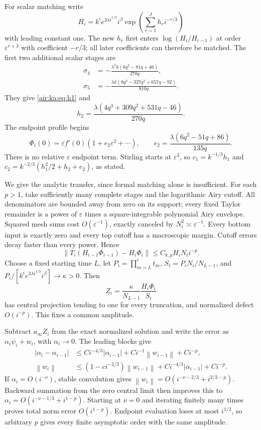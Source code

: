 \documentclass[11pt,letterpaper]{article}
\numberwithin{equation}{section}
\theoremstyle{remark}
\newcommand{\norm}[1]{\left\lVert#1\right\rVert}
\newcommand{\eps}{\varepsilon}
\begin{document}
For scalar matching write
\[
 H_i=k^ie^{3\lambda i^{1/3}}i^\beta
 \exp\left(\sum_{r=1}^Jh_ri^{-r/3}\right)
\]
with leading constant one. The new $h_r$ first enters
$\log(H_i/H_{i-1})$ at order $\eps^{r+3}$ with coefficient $-r/3$; all later coefficients can therefore be matched. The first two additional scalar stages are
\begin{align*}
 \sigma_4&=-\frac{\lambda^2 k(6q^2-81q+46)}{270q},\\
 \sigma_5&=-\frac{\lambda k(8q^3-327q^2+657q-92)}{810q}.
\end{align*}
They give \eqref{air:ka:eq:h1} and
\[
 h_2=\frac{\lambda(4q^3+309q^2+531q-46)}{270q}.
\]
The endpoint profile begins
\[
 \Phi_i(0)=\eps f'(0)(1+e_2\eps^2+\cdots),\qquad
 e_2=\frac{\lambda(6q^2-51q+86)}{135q}.
\]
There is no relative $\eps$ endpoint term. Stirling starts at $\eps^3$, so $c_1=k^{-1/3}h_1$ and $c_2=k^{-2/3}(h_1^2/2+h_2+e_2)$, as stated.

We give the analytic transfer, since formal matching alone is insufficient. For each $p>1$, take sufficiently many complete stages and the logarithmic Airy cutoff. All denominators are bounded away from zero on its support; every fixed Taylor remainder is a power of $\eps$ times a square-integrable polynomial Airy envelope. Squared mesh sums cost $O(\eps^{-1})$, exactly canceled by $N_i^2\asymp\eps^{-1}$. Every bottom input is exactly zero and every top cutoff has a macroscopic margin. Cutoff errors decay faster than every power. Hence
\[
 \norm{T_i(H_{i-1}\Phi_{i-1})-H_i\Phi_i}
 \le C_{k,p}H_iN_i i^{-p}.
\]
Choose a fixed starting time $L$, let $P_i=\prod_{m=L}^it_m$,
$S_i=P_iN_i/N_{L-1}$, and $P_i/[k^ie^{3\lambda i^{1/3}}i^\beta]\to\kappa>0$. Then
\[
 Z_i=\frac{\kappa}{N_{L-1}}\frac{H_i\Phi_i}{S_i}
\]
has central projection tending to one for every truncation, and normalized defect $O(i^{-p})$. This fixes a common amplitude.

Subtract $a_\infty Z_i$ from the exact normalized solution and write the error as $\alpha_i\psi_i+w_i$, with $\alpha_i\to0$. The leading blocks give
\begin{align*}
 |\alpha_i-\alpha_{i-1}|&\le C i^{-4/3}|\alpha_{i-1}|
 +C i^{-1}\norm{w_{i-1}}+C i^{-p},\\
 \norm{w_i}&\le(1-ci^{-2/3})\norm{w_{i-1}}
 +Ci^{-4/3}|\alpha_{i-1}|+Ci^{-p}.
\end{align*}
If $\alpha_i=O(i^{-\nu})$, stable convolution gives
$\norm{w_i}=O(i^{-\nu-2/3}+i^{2/3-p})$. Backward summation from the zero central limit then improves this to
$\alpha_i=O(i^{-\nu-1/3}+i^{1-p})$. Starting at $\nu=0$ and iterating finitely many times proves total norm error $O(i^{1-p})$. Endpoint evaluation loses at most $i^{1/2}$, so arbitrary $p$ gives every finite asymptotic order with the same amplitude.
\end{document}
